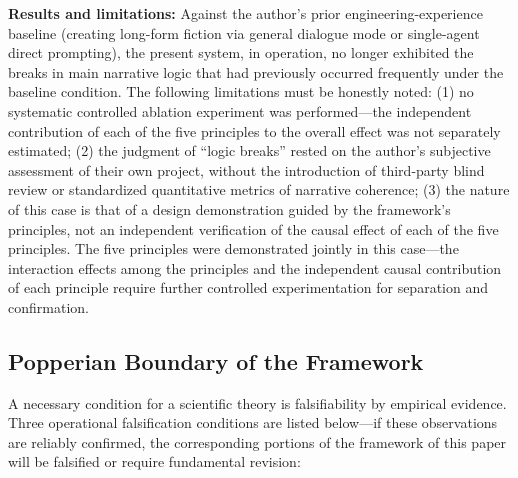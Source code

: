 \documentclass[11pt,a4paper]{article}
\theoremstyle{definition}
\begin{document}
\textbf{Results and limitations:} Against the author's prior engineering-experience baseline (creating long-form fiction via general dialogue mode or single-agent direct prompting), the present system, in operation, no longer exhibited the breaks in main narrative logic that had previously occurred frequently under the baseline condition. The following limitations must be honestly noted: (1) no systematic controlled ablation experiment was performed---the independent contribution of each of the five principles to the overall effect was not separately estimated; (2) the judgment of ``logic breaks'' rested on the author's subjective assessment of their own project, without the introduction of third-party blind review or standardized quantitative metrics of narrative coherence; (3) the nature of this case is that of a design demonstration guided by the framework's principles, not an independent verification of the causal effect of each of the five principles. The five principles were demonstrated jointly in this case---the interaction effects among the principles and the independent causal contribution of each principle require further controlled experimentation for separation and confirmation.

\subsection{Popperian Boundary of the Framework}

A necessary condition for a scientific theory is falsifiability by empirical evidence. Three operational falsification conditions are listed below---if these observations are reliably confirmed, the corresponding portions of the framework of this paper will be falsified or require fundamental revision:
\end{document}
